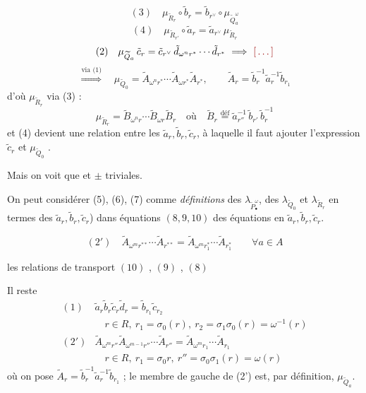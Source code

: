 \documentclass[11pt,a4paper]{article}
\begin{document}
\[
(3)\quad \mu_{\widetilde{R}_r}\circ\tilde b_r = \tilde b_{r^\vee}\circ\mu_{\widetilde{Q}^\omega_a}
\]
\[
(4)\quad \mu_{\widetilde{R}_{r'}}\circ\tilde a_r = \tilde a_{r^\vee}\,\mu_{\widetilde{R}_r}
\]
\[
(2)\quad \mu_{\widetilde{Q}_a}\,\tilde c_r = \tilde c_{r^\vee}\,\tilde d_{\omega^n r^*}\cdots\tilde d_{r^*}
\ \Longrightarrow\ \ill{}
\]
\[
\overset{\text{via (1)}}{\Longrightarrow}\quad
\mu_{\widetilde{Q}_0} = \widetilde{A}_{\omega^n r^*}\cdots\widetilde{A}_{\omega r^*}\widetilde{A}_{r^*},
\qquad \widetilde{A}_r = \tilde b_r^{-1}\tilde a_r^{-1}\tilde b_{r_1}
\]
d'où $\mu_{\widetilde{R}_r}$ via (3) :
\[
\mu_{\widetilde{R}_r} = \widetilde{B}_{\omega^n r}\cdots\widetilde{B}_{\omega r}\widetilde{B}_r
\quad\text{où}\quad
\widetilde{B}_r \overset{\text{déf}}{=} \tilde a_{r''}^{-1}\,\tilde b_{r'}\,\tilde b_r^{-1}
\]
et (4) devient une relation entre les $\tilde a_r, \tilde b_r, \tilde c_r$, à laquelle il faut ajouter l'expression  $\tilde c_r$ \ill{} \ill{} et $\mu_{\widetilde{Q}_0}$ \ill{}.

Mais on voit que  \ill{}  et $\pm$ triviales.

On peut considérer (5), (6), (7) comme \emph{définitions} des $\lambda_{\widetilde{P}^\omega_\bullet}$, des $\lambda_{\widetilde{Q}_0}$ et $\lambda_{\widetilde{R}_r}$ en termes des $\tilde a_r, \tilde b_r, \tilde c_r$) dans  équations $(8, 9, 10)$  des équations en $\tilde a_r, \tilde b_r, \tilde c_r$.

\[
(2')\quad \widetilde{A}_{\omega^m r^{**}}\cdots\widetilde{A}_{r^{**}} = \widetilde{A}_{\omega^m r_1^*}\cdots\widetilde{A}_{r_1^*}
\qquad \forall a\in A
\]

les relations de transport $(10)$ \struck{\ill{}} , $(9)$ \ill{}, $(8)$ \ill{}

Il reste
\[
\begin{array}{ll}
(1) & \tilde a_r\tilde b_r\tilde c_r\tilde d_r = \tilde b_{r_1}\tilde c_{r_2}\\[2pt]
 & \quad r\in R,\ r_1 = \sigma_0(r),\ r_2 = \sigma_1\sigma_0(r) = \omega^{-1}(r)\\[4pt]
(2') & \widetilde{A}_{\omega^m r''}\widetilde{A}_{\omega^{m-1} r''}\cdots\widetilde{A}_{r''} = \widetilde{A}_{\omega^m r_1}\cdots\widetilde{A}_{r_1}\\[2pt]
 & \quad r\in R,\ r_1 = \sigma_0 r,\ r'' = \sigma_0\sigma_1(r) = \omega(r)
\end{array}
\]
où on pose $\widetilde{A}_r = \tilde b_r^{-1}\tilde a_r^{-1}\tilde b_{r_1}$ ; le membre de gauche de (2') est, par définition, $\mu_{\widetilde{Q}_a}$.
\end{document}
